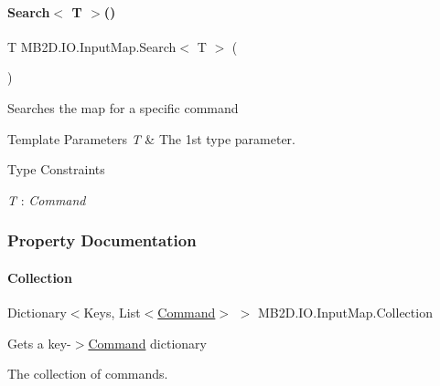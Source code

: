 \paragraph{\texorpdfstring{Search$<$ T $>$()}{Search< T >()}}
{\footnotesize\ttfamily T M\+B2\+D.\+I\+O.\+Input\+Map.\+Search$<$ T $>$ (\begin{DoxyParamCaption}{ }\end{DoxyParamCaption})\hspace{0.3cm}{\ttfamily [inline]}}



Searches the map for a specific command 


\begin{DoxyTemplParams}{Template Parameters}
{\em T} & The 1st type parameter.\\
\hline
\end{DoxyTemplParams}
\begin{Desc}
\item[Type Constraints]\begin{description}
\item[{\em T} : {\em Command}]\end{description}
\end{Desc}


\subsubsection{Property Documentation}
\hypertarget{class_m_b2_d_1_1_i_o_1_1_input_map_a16a798fd9e5c599591620b52c5eb8a55}{}\label{class_m_b2_d_1_1_i_o_1_1_input_map_a16a798fd9e5c599591620b52c5eb8a55} 
\paragraph{\texorpdfstring{Collection}{Collection}}
{\footnotesize\ttfamily Dictionary$<$Keys, List$<$\hyperlink{class_m_b2_d_1_1_i_o_1_1_command}{Command}$>$ $>$ M\+B2\+D.\+I\+O.\+Input\+Map.\+Collection\hspace{0.3cm}{\ttfamily [get]}}



Gets a key-\/$>$\hyperlink{class_m_b2_d_1_1_i_o_1_1_command}{Command} dictionary 

The collection of commands.\hypertarget{class_m_b2_d_1_1_i_o_1_1_input_map_ad78e010b598d32be8fbd1b30c41b7ee0}{}\label{class_m_b2_d_1_1_i_o_1_1_input_map_ad78e010b598d32be8fbd1b30c41b7ee0} 
